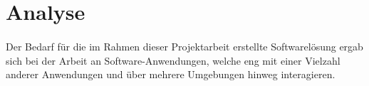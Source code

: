 \section{Analyse}
\paragraph{}
Der Bedarf für die im Rahmen dieser Projektarbeit erstellte Softwarelösung ergab
sich bei der Arbeit an Software-Anwendungen, welche eng mit einer Vielzahl
anderer Anwendungen und über mehrere Umgebungen hinweg interagieren.



